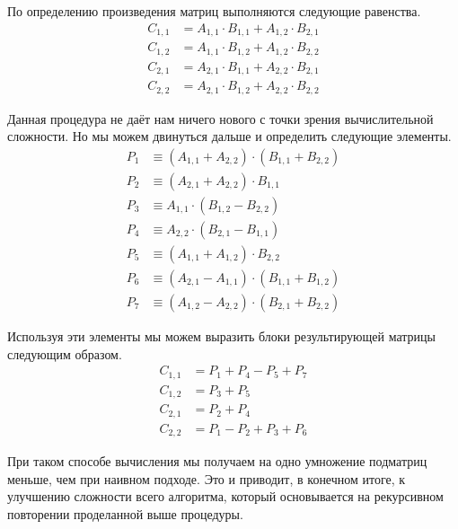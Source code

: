 По определению произведения матриц выполняются следующие равенства.
\begin{align*}
    C_{1, 1} & = A_{1, 1} \cdot B_{1, 1} + A_{1, 2} \cdot B_{2, 1} \\
    C_{1, 2} & = A_{1, 1} \cdot B_{1, 2} + A_{1, 2} \cdot B_{2, 2} \\
    C_{2, 1} & = A_{2, 1} \cdot B_{1, 1} + A_{2, 2} \cdot B_{2, 1} \\
    C_{2, 2} & = A_{2, 1} \cdot B_{1, 2} + A_{2, 2} \cdot B_{2, 2}
\end{align*}

Данная процедура не даёт нам ничего нового с точки зрения вычислительной сложности.
Но мы можем двинуться дальше и определить следующие элементы.
\begin{align*}
    P_1 & \equiv (A_{1, 1} + A_{2, 2}) \cdot (B_{1, 1} + B_{2, 2}) \\
    P_2 & \equiv (A_{2, 1} + A_{2, 2}) \cdot B_{1, 1}              \\
    P_3 & \equiv A_{1, 1} \cdot (B_{1, 2} - B_{2, 2})              \\
    P_4 & \equiv A_{2, 2} \cdot (B_{2, 1} - B_{1, 1})              \\
    P_5 & \equiv (A_{1, 1} + A_{1, 2}) \cdot B_{2, 2}              \\
    P_6 & \equiv (A_{2, 1} - A_{1, 1}) \cdot (B_{1, 1} + B_{1, 2}) \\
    P_7 & \equiv (A_{1, 2} - A_{2, 2}) \cdot (B_{2, 1} + B_{2, 2})
\end{align*}

Используя эти элементы мы можем выразить блоки результирующей матрицы следующим образом.
\begin{align*}
    C_{1, 1} & = P_1 + P_4 - P_5 + P_7 \\
    C_{1, 2} & = P_3 + P_5             \\
    C_{2, 1} & = P_2 + P_4             \\
    C_{2, 2} & = P_1 - P_2 + P_3 + P_6
\end{align*}

При таком способе вычисления мы получаем на одно умножение подматриц меньше, чем при наивном подходе.
Это и приводит, в конечном итоге, к улучшению сложности всего алгоритма, который основывается на рекурсивном повторении проделанной выше процедуры.

